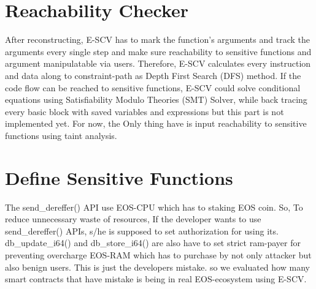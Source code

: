 

\section{Reachability Checker}
After reconstructing, E-SCV has to mark the function's arguments and track the arguments every single step and make sure reachability to sensitive functions and argument manipulatable via users. Therefore, E-SCV calculates every instruction and data along to constraint-path as Depth First Search (DFS) method. If the code flow can be reached to sensitive functions, E-SCV could solve conditional equations using Satisfiability Modulo Theories (SMT) Solver, while back tracing every basic block with saved variables and expressions but this part is not implemented yet. For now, the Only thing have is input reachability to sensitive functions using taint analysis.


\section{Define Sensitive Functions}
The send\_dereffer() API use EOS-CPU which has to staking EOS coin. So, To reduce unnecessary waste of resources, If the developer wants to use send\_dereffer() APIs, s/he is supposed to set authorization for using its. db\_update\_i64() and db\_store\_i64() are also have to set strict ram-payer for preventing overcharge EOS-RAM which has to purchase by not only attacker but also benign users. This is just the developers mistake. so we evaluated how many smart contracts that have mistake is being in real EOS-ecosystem using E-SCV.

